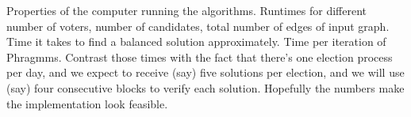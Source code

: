 Properties of the computer running the algorithms.
Runtimes for different number of voters, number of candidates, total number of edges of input graph.
Time it takes to find a balanced solution approximately. Time per iteration of Phragmms. 
Contrast those times with the fact that there's one election process per day, and we expect to receive (say) five solutions per election, and we will use (say) four consecutive blocks to verify each solution. Hopefully the numbers make the implementation look feasible.




